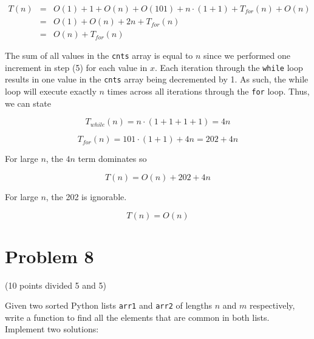 \documentclass{article}
\begin{document}
\begin{eqnarray*}
  T(n) &=& O(1) + 1 + O(n) + O(101) + n \cdot (1 + 1) + T_{for}(n) + O(n) \\
  &=& O(1) + O(n) + 2n + T_{for}(n) \\
  &=& O(n) + T_{for}(n)
\end{eqnarray*}

The sum of all values in the \verb|cnts| array is equal to $n$ since
we performed one increment in step (5) for each value in $x$.  Each
iteration through the \verb|while| loop results in one value in the
\verb|cnts| array being decremented by 1.  As such, the while loop
will execute exactly $n$ times across all iterations through the
\verb|for| loop.  Thus, we can state

\begin{equation*}
  T_{while}(n) = n \cdot (1 + 1 + 1 + 1) = 4n
\end{equation*}

\begin{equation}
  T_{for}(n) = 101 \cdot (1 + 1) + 4n = 202 + 4n
\end{equation}

For large $n$, the $4n$ term dominates so

\begin{equation*}
  T(n) = O(n) + 202 + 4n
\end{equation*}

For large $n$, the 202 is ignorable.

\begin{equation*}
  \boxed{T(n) = O(n)}
\end{equation*}

\section{Problem 8} (10 points divided 5 and 5)

Given two sorted Python lists \verb|arr1| and \verb|arr2| of lengths
$n$ and $m$ respectively, write a function to find all the elements
that are common in both lists. Implement two solutions:
\end{document}
